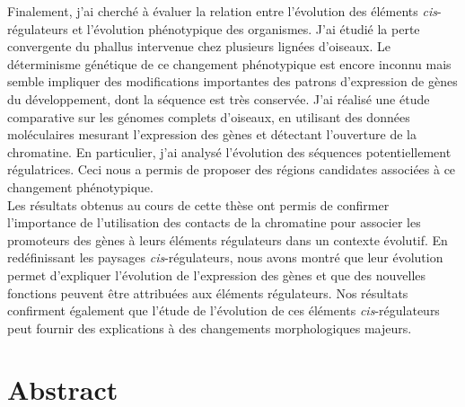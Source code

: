 Finalement, j’ai cherché à évaluer la relation entre l’évolution des éléments \textit{cis}-régulateurs et l’évolution phénotypique des organismes. J’ai étudié la perte convergente du phallus intervenue chez plusieurs lignées d’oiseaux. Le déterminisme génétique de ce changement phénotypique est encore inconnu mais semble impliquer des modifications importantes des patrons d’expression de gènes du développement, dont la séquence est très conservée. J'ai réalisé une étude comparative sur les génomes complets d'oiseaux, en utilisant des données moléculaires mesurant l'expression des gènes et détectant l’ouverture de la chromatine. En particulier, j’ai analysé l’évolution des séquences potentiellement régulatrices. Ceci nous a permis de proposer des régions candidates associées à ce changement phénotypique. \\

Les résultats obtenus au cours de cette thèse ont permis de confirmer l’importance de l’utilisation des contacts de la chromatine pour associer les promoteurs des gènes à leurs éléments régulateurs dans un contexte évolutif. En redéfinissant les paysages \textit{cis}-régulateurs, nous avons montré que leur évolution permet d’expliquer l’évolution de l’expression des gènes et que des nouvelles fonctions peuvent être attribuées aux éléments régulateurs. Nos résultats confirment également que l'étude de l'évolution de ces éléments \textit{cis}-régulateurs peut fournir des explications à des changements morphologiques majeurs.\\

\chapter*{Abstract}
\label{abstract}

